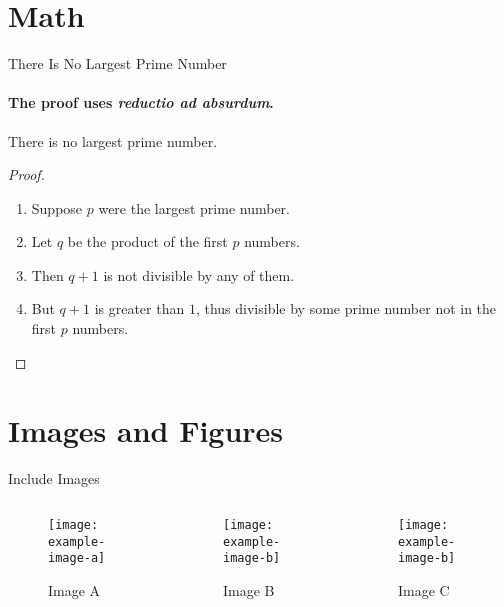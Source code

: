 \documentclass{beamer}
\begin{document}
\section{Math}
\rptusectionpage

\begin{frame}{There Is No Largest Prime Number}
\framesubtitle{The proof uses \textit{reductio ad absurdum}.} 
\begin{theorem}
There is no largest prime number. \end{theorem} 

\pause
\begin{proof}
	\begin{enumerate} 
\item<2-| alert@2> Suppose $p$ were the largest prime number. 
\item<3-> Let $q$ be the product of the first $p$ numbers. 
\item<3-> Then $q+1$ is not divisible by any of them. 
\item<4-> But $q + 1$ is greater than $1$, thus divisible by some prime
number not in the first $p$ numbers.
\end{enumerate}
\end{proof}
\end{frame}


\section{Images and Figures}
\rptusectionpage

\begin{frame}{Include Images}
	\begin{columns}
	\begin{column}{0.3\textwidth}
		\begin{figure}
			\texttt{[image: example-image-a]}
			\caption{Image A}
		\end{figure}
	\end{column}
	\begin{column}{0.3\textwidth}
		\begin{figure}
			\texttt{[image: example-image-b]}
			\caption{Image B}
		\end{figure}
	\end{column}
	\begin{column}{0.3\textwidth}
		\begin{figure}
			\texttt{[image: example-image-b]}
			\caption{Image C}
		\end{figure}
	\end{column}
	\end{columns}

\vspace{1em}
\end{frame}
\end{document}
